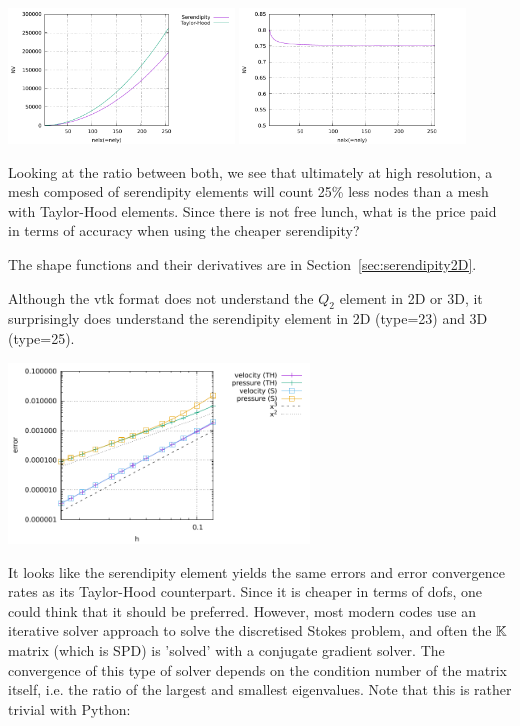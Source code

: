 \begin{center}
\includegraphics[width=6cm]{python_codes/fieldstone_52/images/NV.pdf}
\includegraphics[width=6cm]{python_codes/fieldstone_52/images/NV_ratio.pdf}
\end{center}
Looking at the ratio between both, we see that ultimately 
at high resolution, a mesh composed of serendipity elements 
will count 25\% less nodes than a mesh with Taylor-Hood elements.
Since there is not free lunch, what is the price paid in terms of accuracy when using 
the cheaper serendipity? 

The shape functions and their derivatives are in Section~\ref{sec:serendipity2D}.

Although the vtk format does not understand the $Q_2$ element in 2D or 3D, it surprisingly does
understand the serendipity element in 2D (type=23) and 3D (type=25).

\begin{center}
\includegraphics[width=8cm]{python_codes/fieldstone_52/images/errors.pdf}
\end{center}

It looks like the serendipity element yields the same errors and error convergence 
rates as its Taylor-Hood counterpart. Since it is cheaper in terms of dofs, 
one could think that it should be preferred. However, most modern codes 
use an iterative solver approach to solve the discretised Stokes problem, and 
often the ${\mathbb{K}}$ matrix (which is SPD) is 'solved' with a conjugate gradient solver.  
The convergence of this type of solver depends on the condition number of the matrix
itself, i.e. the ratio of the largest and smallest eigenvalues. 
Note that this is rather trivial with Python:

